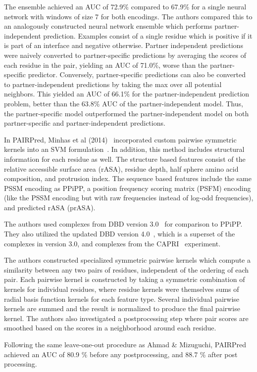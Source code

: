 The ensemble achieved an AUC of 72.9\% compared to 67.9\% for a single neural network with windows of size 7 for both encodings.
The authors compared this to an analogously constructed neural network ensemble which performs partner-independent prediction.
Examples consist of a single residue which is positive if it is part of an interface and negative otherwise.
Partner independent predictions were naively converted to partner-specific predictions by averaging the scores of each residue in the pair, yielding an AUC of 71.0\%, worse than the partner-specific predictor.
Conversely, partner-specific predictions can also be converted to partner-independent predictions by taking the max over all potential neighbors. 
This yielded an AUC of 66.1\% for the partner-independent prediction problem, better than the 63.8\% AUC of the partner-independent model.
Thus, the partner-specific model outperformed the partner-independent model on both partner-specific and partner-independent predictions.

In PAIRPred, Minhas et al (2014)~\cite{minhas2014} incorporated custom pairwise symmetric kernels into an SVM formulation~\cite{minhas2014}.
In addition, this method includes structural information for each residue as well.
The structure based features consist of the relative accessible surface area (rASA), residue depth, half sphere amino acid composition, and protrusion index.
The sequence based features include the same PSSM encoding as PPiPP, a position frequency scoring matrix (PSFM) encoding (like the PSSM encoding but with raw frequencies instead of log-odd frequencies), and predicted rASA (prASA).

The authors used complexes from DBD version 3.0~\cite{hwang2008} for comparison to PPiPP.
They also utilized the updated DBD version 4.0~\cite{hwang2010}, which is a superset of the complexes in version 3.0, and complexes from the CAPRI~\cite{janin2013} experiment.

The authors constructed specialized symmetric pairwise kernels which compute a similarity between any two pairs of residues, independent of the ordering of each pair.
Each pairwise kernel is constructed by taking a symmetric combination of kernels for individual residues, where residue kernels were themselves sums of radial basis function kernels for each feature type.
Several individual pairwise kernels are summed and the result is normalized to produce the final pairwise kernel.
The authors also investigated a postprocessing step where pair scores are smoothed based on the scores in a neighborhood around each residue.

Following the same leave-one-out procedure as Ahmad \& Mizuguchi, PAIRPred achieved an AUC of 80.9 \% before any postprocessing, and 88.7 \% after post processing.